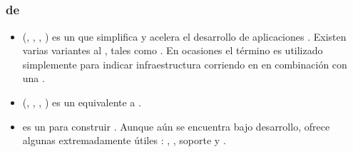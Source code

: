 \subsection{\fullstackAS \javaScriptNAME \frameworksPC}
\label{cap:estadoArte:section:fullstack_javaScript_framework}

\subsubsection{\stackAS de \javaScriptNAME \frameworksPC}
	\begin{itemize}
		\item
			\textbf{\meanstackNAME} (\mongodbNAME, \expressjsNAME, \angularjsNAME, \nodejsNAME) es un \fullstackAS \javaScriptNAME \frameworkPC que simplifica y acelera el desarrollo de aplicaciones \webINT \cite{online_mean_io}. Existen varias variantes al \stackAS \meanstackNAME, tales como \meenstackNAME. En ocasiones el término es utilizado simplemente para indicar infraestructura corriendo en \nodejsNAME en combinación con una \dataBasesDB \nosqlNAME.
		\item
			\textbf{\meenstackNAME} \cite{online_meen_github}(\mongodbNAME, \emberjsNAME, \expressjsNAME, \nodejsNAME) es un \fullstackAS \javaScriptNAME \frameworkPC equivalente a \meanstackNAMEref.
		\item
			\textbf{\socketStreamNAME} es un \fullstackAS \javaScriptNAME para construir \singlePageAppINT. Aunque aún se encuentra bajo desarrollo, ofrece algunas extremadamente útiles \featuresCPT: \websocketsINT, \renderingCPT \clientSideAS, soporte \httpNAME y \authenticationINT \builtINPL \cite{online_socketstream_official_org}.


\end{itemize}
